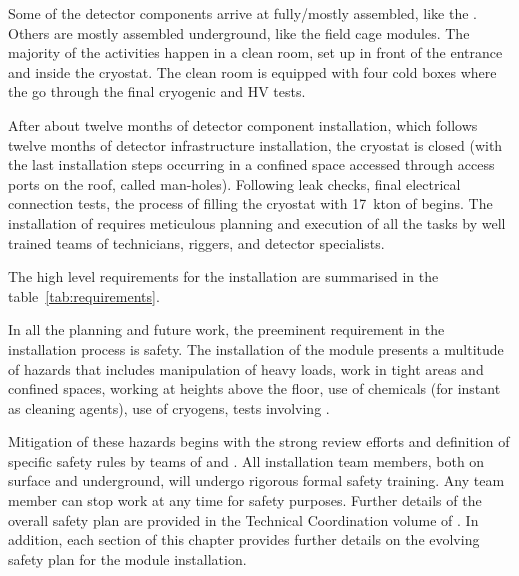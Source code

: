Some of the detector components arrive at  fully/mostly assembled, like the .
Others are mostly assembled underground, like the field cage modules.
The majority of the activities happen in a clean room, set up in front of the  entrance and inside the cryostat.
The clean room is equipped with four cold boxes where the  go through the final cryogenic and HV tests.

After about twelve months of detector component installation, which follows twelve months of detector infrastructure installation, the cryostat is closed (with the last installation steps occurring in a confined space accessed through access ports on the roof, called man-holes).
Following leak checks, final electrical connection tests, the process of filling the cryostat with 17~kton of  begins.
The installation of  requires meticulous planning and execution of all the tasks by well trained teams of technicians, riggers, and detector specialists.

The high level requirements for the  installation are summarised in the table~\ref{tab:requirements}.



In all the planning and future work, the preeminent requirement in the installation process is safety.
The installation of the  module presents a multitude of hazards that includes manipulation of heavy loads, work in tight areas and confined spaces, working at heights above the floor, use of chemicals (for instant as cleaning agents), use of cryogens, tests involving .

Mitigation of these hazards begins with the strong review efforts and definition of specific safety rules by  teams of  and .
All installation team members, both on surface and underground, will undergo rigorous formal safety training.
Any team member can stop work at any time for safety purposes.
Further details of the overall  safety plan are provided in the Technical Coordination volume of .
In addition, each section of this chapter provides further details on the evolving safety plan for the  module installation.


